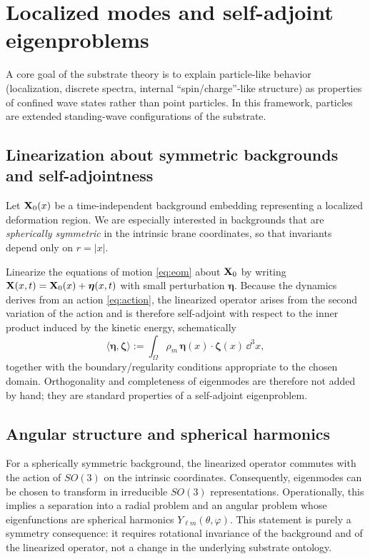 \section{Localized modes and self-adjoint eigenproblems}
\label{sec:localized}

A core goal of the substrate theory is to explain particle-like behavior (localization, discrete spectra,
internal ``spin/charge''-like structure) as properties of confined wave states rather than point particles.
In this framework, particles are extended standing-wave configurations of the substrate.

\subsection{Linearization about symmetric backgrounds and self-adjointness}

Let $\mathbf{X}_0(x)$ be a time-independent background embedding representing a localized deformation region.
We are especially interested in backgrounds that are \emph{spherically symmetric} in the intrinsic brane coordinates,
so that invariants depend only on $r=|x|$.

Linearize the equations of motion \eqref{eq:eom} about $\mathbf{X}_0$ by writing
$\mathbf{X}(x,t)=\mathbf{X}_0(x)+\bm{\eta}(x,t)$ with small perturbation $\bm{\eta}$.
Because the dynamics derives from an action \eqref{eq:action}, the linearized operator arises from the second
variation of the action and is therefore self-adjoint with respect to the inner product induced by the kinetic energy,
schematically
\begin{equation}
  \langle \bm{\eta},\bm{\zeta}\rangle
  :=\int_{\Omega} \rho_m\,\bm{\eta}(x)\cdot \bm{\zeta}(x)\,\dd^3x,
  \label{eq:inner-product}
\end{equation}
together with the boundary/regularity conditions appropriate to the chosen domain.
Orthogonality and completeness of eigenmodes are therefore not added by hand; they are standard properties of a
self-adjoint eigenproblem.

\subsection{Angular structure and spherical harmonics}

For a spherically symmetric background, the linearized operator commutes with the action of $SO(3)$ on the intrinsic
coordinates.
Consequently, eigenmodes can be chosen to transform in irreducible $SO(3)$ representations.
Operationally, this implies a separation into a radial problem and an angular problem whose eigenfunctions are
spherical harmonics $Y_{\ell m}(\theta,\varphi)$.
This statement is purely a symmetry consequence: it requires rotational invariance of the background and of the
linearized operator, not a change in the underlying substrate ontology.

